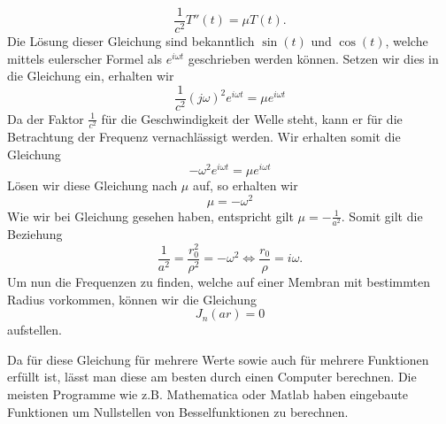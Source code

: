 \begin{equation}
\frac{1}{c^2} T''(t) = \mu T(t).
\end{equation} 
Die Lösung dieser Gleichung sind bekanntlich $\sin(t)$ und $\cos(t)$, welche mittels eulerscher Formel als $e^{i\omega t}$ geschrieben werden können.
Setzen wir dies in die Gleichung ein, erhalten wir
\begin{equation}
\frac{1}{c^2}(j\omega)^2 e^{i\omega t} = \mu e^{i\omega t}
\end{equation}
Da der Faktor $\frac{1}{c^2}$ für die Geschwindigkeit der Welle steht, kann er für die Betrachtung der Frequenz vernachlässigt werden. Wir erhalten somit die Gleichung
\begin{equation}
-\omega^2 e^{i\omega t} = \mu e^{i\omega t}
\end{equation}
Lösen wir diese Gleichung nach $\mu$ auf, so erhalten wir
\begin{equation}
\mu = -\omega^2
\end{equation}
Wie wir bei Gleichung  gesehen haben, entspricht gilt $\mu = -\frac{1}{a^2}$. Somit gilt die Beziehung
\begin{equation}
\frac{1}{a^2} = \frac{r_0^2}{\rho^2} = -\omega^2
\Leftrightarrow
\frac{r_0}{\rho} = i\omega.
\end{equation}
Um nun die Frequenzen zu finden, welche auf einer Membran mit bestimmten Radius vorkommen, können wir die Gleichung
\begin{equation}
J_n(ar) = 0
\end{equation}
aufstellen.

Da für diese Gleichung für mehrere Werte sowie auch für mehrere Funktionen erfüllt ist, lässt man diese am besten durch einen Computer berechnen. Die meisten Programme wie z.B. Mathematica oder Matlab haben eingebaute Funktionen um Nullstellen von Besselfunktionen zu berechnen.


